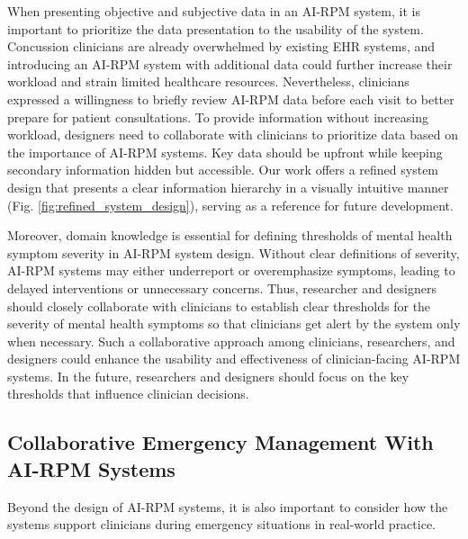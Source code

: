 When presenting objective and subjective data in an AI-RPM system, it is important to prioritize the data presentation to the usability of the system. 
Concussion clinicians are already overwhelmed by existing EHR systems, and introducing an AI-RPM system with additional data could further increase their workload and strain limited healthcare resources.
Nevertheless, clinicians expressed a willingness to briefly review AI-RPM data before each visit to better prepare for patient consultations.
To provide information without increasing workload, designers need to collaborate with clinicians to prioritize data based on the importance of AI-RPM systems. 
Key data should be upfront while keeping secondary information hidden but accessible.
Our work offers a refined system design that presents a clear information hierarchy in a visually intuitive manner (Fig. \ref{fig:refined_system_design}), serving as a reference for future development.




Moreover, domain knowledge is essential for defining thresholds of mental health symptom severity in AI-RPM system design.
Without clear definitions of severity, AI-RPM systems may either underreport or overemphasize symptoms, leading to delayed interventions or unnecessary concerns. 
Thus, researcher and designers should closely collaborate with clinicians to establish clear thresholds for the severity of mental health symptoms so that clinicians get alert by the system only when necessary.
Such a collaborative approach among clinicians, researchers, and designers could enhance the usability and effectiveness of clinician-facing AI-RPM systems.
In the future, researchers and designers should focus on the key thresholds that influence clinician decisions.













\subsection{Collaborative Emergency Management With AI-RPM Systems}
Beyond the design of AI-RPM systems, it is also important to consider how the systems support clinicians during emergency situations in real-world practice.

